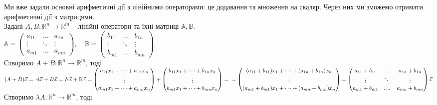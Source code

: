 \documentclass[a4paper, 10pt]{article}
\theoremstyle{theoremdd}
\begin{document}
	Ми вже задали основні арифметичні дії з лінійними операторами: це додавання та множення на скаляр. Через них ми зможемо отримати арифметичні дії з матрицями.\\
	Задані $A,B \colon \mathbb{R}^n \to \mathbb{R}^m$ -- лінійні оператори та їхні матриці $\mathbb{A}, \mathbb{B}$.\\
	$\mathbb{A} = \begin{pmatrix}
	a_{11} & \dots & a_{1n} \\
	\vdots & \ddots & \vdots \\
	a_{m1} & \dots & a_{mn}
	\end{pmatrix}, \quad \mathbb{B} = \begin{pmatrix}
	b_{11} & \dots & b_{1n} \\
	\vdots & \ddots & \vdots \\
	b_{m1} & \dots & b_{mn}
	\end{pmatrix}$.\\
	Створимо $A+B \colon \mathbb{R}^n \to \mathbb{R}^m$, тоді\\
	$(A+B)\vec{x} = A \vec{x} + B \vec{x} = \mathbb{A} \vec{x} + \mathbb{B} \vec{x} = \begin{pmatrix}
	a_{11}x_1 + \dots + a_{1n} x_n \\
	\vdots \\
	a_{m1}x_1 + \dots + a_{mn} x_n \\
	\end{pmatrix} + \begin{pmatrix}
	b_{11}x_1 + \dots + b_{1n} x_n \\
	\vdots \\
	b_{m1}x_1 + \dots + b_{mn} x_n \\
	\end{pmatrix} = \\
	= \begin{pmatrix}
	(a_{11}+b_{11})x_1 + \dots + (a_{1n}+b_{1n}) x_n \\
	\vdots \\
	(a_{m1} + b_{m1})x_1 + \dots + (a_{mn}+b_{mn}) x_n \\
	\end{pmatrix} = \begin{pmatrix}
	a_{11} + b_{11} & \dots & a_{1n} + b_{1n} \\
	\vdots & \ddots & \vdots \\
	a_{m1} + b_{m1} & \dots & a_{mn} + b_{mn}
	\end{pmatrix} \vec{x}$
	\bigskip \\
	Створимо $\lambda A \colon \mathbb{R}^n \to \mathbb{R}^m$, тоді\\
\end{document}
